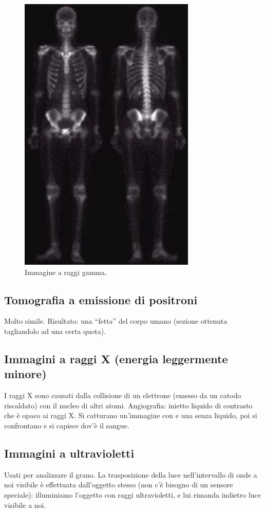 \documentclass[a4paper,11pt]{article}
\begin{document}
\renewcommand{\thefigure}{1.2}
\begin{figure}[!h]
  \centering
    \includegraphics[scale=0.7]{images/1/gamma_ray.png}
    \caption{Immagine a raggi gamma.}
\end{figure}

\subsection{Tomografia a emissione di positroni}
Molto simile. Risultato: una ``fetta'' del corpo umano (sezione ottenuta tagliandolo ad una certa quota).

\subsection{Immagini a raggi X (energia leggermente minore)}
I raggi X sono causati dalla collisione di un elettrone (emesso da un catodo riscaldato) con il nucleo di altri atomi.
Angiografia: inietto liquido di contrasto che è opaco ai raggi X. Si catturano un'immagine con e una senza liquido, poi si confrontano e si capisce dov'è il sangue.

\subsection{Immagini a ultravioletti}
\label{sec:moving_energy}
Usati per analizzare il grano. La trasposizione della luce nell'intervallo di onde a noi visibile è effettuata dall'oggetto stesso (non c'è bisogno di un sensore speciale):
illuminiamo l'oggetto con raggi ultravioletti, e lui rimanda indietro luce visibile a noi.
\end{document}
